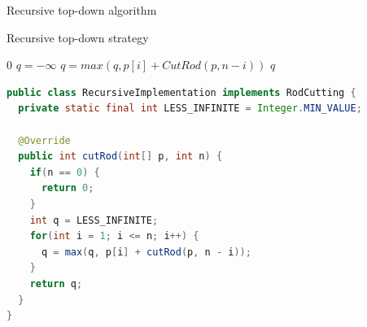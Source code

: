 \begin{frame}{Recursive top-down algorithm}

  \begin{block}{Recursive top-down strategy}
  \begin{algorithmic}
         $0$ 
      \EndIf
      \State $q = - \infty$
         \State $q = max(q, p[i] + CutRod(p, n-i))$ 
         \EndFor
       $q$   
    \EndProcedure
  \end{algorithmic}  
  \end{block}

\end{frame}

\begin{frame}[fragile]
  \begin{scriptsize}
  \begin{lstlisting}[language=Java]
public class RecursiveImplementation implements RodCutting {
  private static final int LESS_INFINITE = Integer.MIN_VALUE;

  @Override
  public int cutRod(int[] p, int n) {
    if(n == 0) {
      return 0;
    }
    int q = LESS_INFINITE;
    for(int i = 1; i <= n; i++) {
      q = max(q, p[i] + cutRod(p, n - i));
    }
    return q;
  }
}
  \end{lstlisting}
  \end{scriptsize}
\end{frame}



